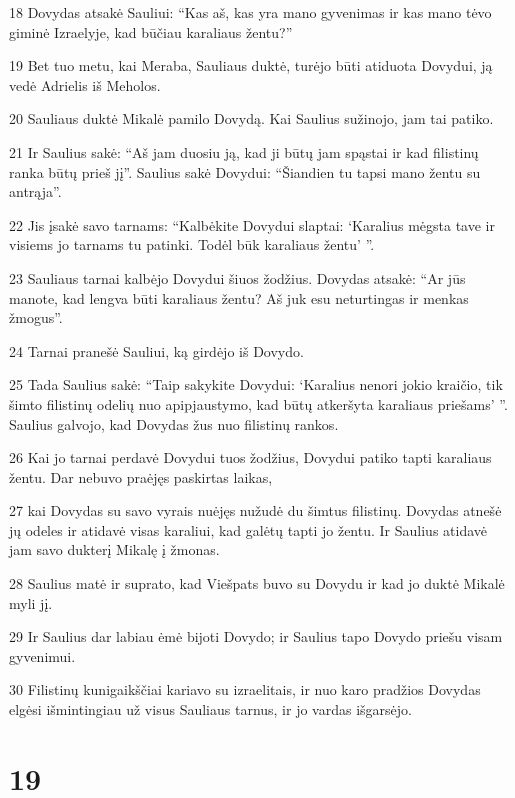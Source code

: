 \par 18 Dovydas atsakė Sauliui: “Kas aš, kas yra mano gyvenimas ir kas mano tėvo giminė Izraelyje, kad būčiau karaliaus žentu?” 
\par 19 Bet tuo metu, kai Meraba, Sauliaus duktė, turėjo būti atiduota Dovydui, ją vedė Adrielis iš Meholos. 
\par 20 Sauliaus duktė Mikalė pamilo Dovydą. Kai Saulius sužinojo, jam tai patiko. 
\par 21 Ir Saulius sakė: “Aš jam duosiu ją, kad ji būtų jam spąstai ir kad filistinų ranka būtų prieš jį”. Saulius sakė Dovydui: “Šiandien tu tapsi mano žentu su antrąja”. 
\par 22 Jis įsakė savo tarnams: “Kalbėkite Dovydui slaptai: ‘Karalius mėgsta tave ir visiems jo tarnams tu patinki. Todėl būk karaliaus žentu’ ”. 
\par 23 Sauliaus tarnai kalbėjo Dovydui šiuos žodžius. Dovydas atsakė: “Ar jūs manote, kad lengva būti karaliaus žentu? Aš juk esu neturtingas ir menkas žmogus”. 
\par 24 Tarnai pranešė Sauliui, ką girdėjo iš Dovydo. 
\par 25 Tada Saulius sakė: “Taip sakykite Dovydui: ‘Karalius nenori jokio kraičio, tik šimto filistinų odelių nuo apipjaustymo, kad būtų atkeršyta karaliaus priešams’ ”. Saulius galvojo, kad Dovydas žus nuo filistinų rankos. 
\par 26 Kai jo tarnai perdavė Dovydui tuos žodžius, Dovydui patiko tapti karaliaus žentu. Dar nebuvo praėjęs paskirtas laikas, 
\par 27 kai Dovydas su savo vyrais nuėjęs nužudė du šimtus filistinų. Dovydas atnešė jų odeles ir atidavė visas karaliui, kad galėtų tapti jo žentu. Ir Saulius atidavė jam savo dukterį Mikalę į žmonas. 
\par 28 Saulius matė ir suprato, kad Viešpats buvo su Dovydu ir kad jo duktė Mikalė myli jį. 
\par 29 Ir Saulius dar labiau ėmė bijoti Dovydo; ir Saulius tapo Dovydo priešu visam gyvenimui. 
\par 30 Filistinų kunigaikščiai kariavo su izraelitais, ir nuo karo pradžios Dovydas elgėsi išmintingiau už visus Sauliaus tarnus, ir jo vardas išgarsėjo.



\chapter{19}

